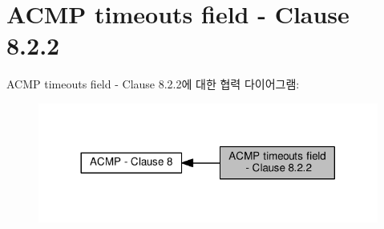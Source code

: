 \hypertarget{group__acmp__timeouts}{}\section{A\+C\+MP timeouts field -\/ Clause 8.2.2}
\label{group__acmp__timeouts}
A\+C\+MP timeouts field -\/ Clause 8.2.2에 대한 협력 다이어그램\+:
\nopagebreak
\begin{figure}[H]
\begin{center}
\leavevmode
\includegraphics[width=317pt]{group__acmp__timeouts}
\end{center}
\end{figure}
